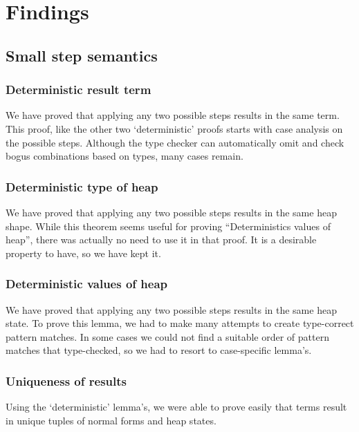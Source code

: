 \documentclass{article}
\begin{document}
\section{Findings}\label{sec:findings}

\subsection{Small step semantics}

\subsubsection{Deterministic result term}

We have proved that applying any two possible steps results in the
same term.  This proof, like the other two `deterministic' proofs
starts with case analysis on the possible steps. Although the type
checker can automatically omit and check bogus combinations based on
types, many cases remain.

\subsubsection{Deterministic type of heap}

We have proved that applying any two possible steps results in the same heap shape.
While this theorem seems useful for proving ``Deterministics values of heap'', there was actually no need to use it in that proof. It is a desirable property to have, so we have kept it.

\subsubsection{Deterministic values of heap}

We have proved that applying any two possible steps results in the
same heap state.  To prove this lemma, we had to make many attempts to
create type-correct pattern matches. In some cases we could not find a
suitable order of pattern matches that type-checked, so we had to
resort to case-specific lemma's.

\subsubsection{Uniqueness of results}

Using the `deterministic' lemma's, we were able to prove easily that terms result in unique tuples of normal forms and heap states.
\end{document}

